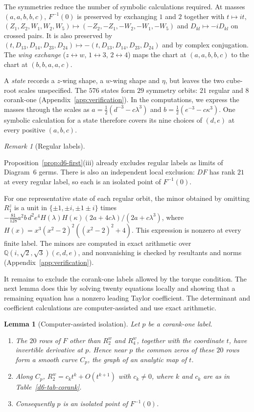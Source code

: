 \documentclass[11pt]{amsart}
\newenvironment{romanlist}{\begin{enumerate}\renewcommand{\labelenumi}{(\roman{enumi})}%
  \renewcommand{\theenumi}{\roman{enumi}}}{\end{enumerate}}
\newtheorem{lemma}[theorem]{Lemma}
\theoremstyle{definition}
\theoremstyle{remark}
\newtheorem{remark}[theorem]{Remark}
\begin{document}
{
The symmetries reduce the number of symbolic calculations required.
At masses $(a,a,b,b,c)$, $F^{-1}(0)$ is preserved by exchanging $1$ and $2$
together with $t\mapsto it$,
$(Z_1,Z_2,W_1,W_2,W_5)\mapsto(-Z_2,-Z_1,-W_2,-W_1,-W_5)$ and
$D_{kl}\mapsto-iD_{kl}$ on crossed pairs.  It is also preserved by
$(t,D_{13},D_{14},D_{23},D_{24})\mapsto-(t,D_{13},D_{14},D_{23},D_{24})$
and by complex conjugation.  The \emph{wing exchange}
($z\leftrightarrow w$, $1\leftrightarrow3$, $2\leftrightarrow4$) maps the chart
at $(a,a,b,b,c)$ to the chart at $(b,b,a,a,c)$.

A \emph{state} records a $z$-wing shape, a $w$-wing shape and $\eta$,
but leaves the two cube-root scales unspecified.  The $576$ states form
$29$ symmetry orbits: $21$ regular and $8$ corank-one
(Appendix~\ref{app:verification}).
In the computations, we express the masses through the scales as
$a=\frac12(d^{-3}-c\lambda^3)$ and $b=\frac12(e^{-3}-c\kappa^3)$.
One symbolic calculation for a state therefore covers its nine choices
of $(d,e)$ at every positive $(a,b,c)$.
}

\begin{remark}[Regular labels]\label{d6-rem-regular}
{
Proposition~\ref{prop:d6-first}(iii) already excludes regular labels as
limits of Diagram~6 germs.  There is also an independent local exclusion:
$DF$ has rank $21$ at every regular label, so each is an isolated point
of $F^{-1}(0)$.

For one representative state of each regular orbit, the minor obtained
by omitting $R^z_1$ is a unit in $\{\pm1,\pm i,\pm1\pm i\}$ times
$-\frac{81}{128}a^2b\,d^2e^4H(\lambda)H(\kappa)(2a+4c\lambda)/(2a+c\lambda^3)$,
where $H(x)=x^3(x^2-2)^2((x^2-2)^2+4)$.  This expression is nonzero
at every finite label.  The minors are computed in exact arithmetic over
$\mathbb Q(i,\sqrt2,\sqrt3)(c,d,e)$, and nonvanishing is checked by
resultants and norms (Appendix~\ref{app:verification}).
}
\end{remark}

{
It remains to exclude the corank-one labels allowed by the torque
condition.  The next lemma does this by solving twenty equations locally
and showing that a remaining equation has a nonzero leading Taylor
coefficient.  The determinant and coefficient calculations are
computer-assisted and use exact arithmetic.
}

\begin{lemma}[Computer-assisted isolation]\label{d6-lem-corank}
Let $p$ be a corank-one label.
\begin{romanlist}
  \item The $20$ rows of $F$ other than $R^w_2$ and $R^w_4$, together with the coordinate $t$,
  have invertible derivative at $p$.  Hence near $p$ the common zeros of these $20$ rows form a
  smooth curve $C_p$, the graph of an analytic map of $t$.
  \item Along $C_p$, $R^w_2=c_kt^k+O(t^{k+1})$ with $c_k\ne0$, where $k$ and $c_k$ are as in
  Table~\ref{d6-tab-corank}.
  \item Consequently $p$ is an isolated point of $F^{-1}(0)$.
\end{romanlist}
\end{lemma}
\end{document}
